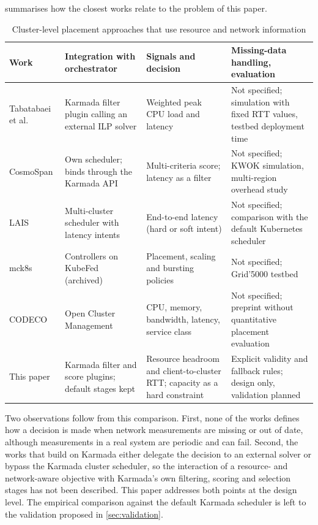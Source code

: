  summarises how the closest works relate to the problem of this paper.

\begin{table}[t]
\caption{Cluster-level placement approaches that use resource and network information}\label{tab:related}
\centering\small{}
\begin{tabularx}{\textwidth}{@{}p{2.3cm}LLL@{}}
\toprule
\textbf{Work} & \textbf{Integration with orchestrator} & \textbf{Signals and decision} & \textbf{Missing-data handling, evaluation} \\
\midrule
Tabatabaei et al.\ \cite{tabatabaei2025cnf} & Karmada filter plugin calling an external ILP solver & Weighted peak CPU load and latency & Not specified; simulation with fixed RTT values, testbed deployment time \\
CosmoSpan \cite{bregar2026cosmospan} & Own scheduler; binds through the Karmada API & Multi-criteria score; latency as a filter & Not specified; KWOK simulation, multi-region overhead study \\
LAIS \cite{chiaro2024lais} & Multi-cluster scheduler with latency intents & End-to-end latency (hard or soft intent) & Not specified; comparison with the default Kubernetes scheduler \\
mck8s \cite{tamiru2021mck8s} & Controllers on KubeFed (archived) & Placement, scaling and bursting policies & Not specified; Grid'5000 testbed \\
CODECO \cite{sofia2026codeco} & Open Cluster Management & CPU, memory, bandwidth, latency, service class & Not specified; preprint without quantitative placement evaluation \\
This paper & Karmada filter and score plugins; default stages kept & Resource headroom and client-to-cluster RTT; capacity as a hard constraint & Explicit validity and fallback rules; design only, validation planned \\
\bottomrule
\end{tabularx}
\end{table}

Two observations follow from this comparison. First, none of the works defines how a decision is made when network measurements are missing or out of date, although measurements in a real system are periodic and can fail. Second, the works that build on Karmada either delegate the decision to an external solver or bypass the Karmada cluster scheduler, so the interaction of a resource- and network-aware objective with Karmada's own filtering, scoring and selection stages has not been described. This paper addresses both points at the design level. The empirical comparison against the default Karmada scheduler is left to the validation proposed in \cref{sec:validation}.
